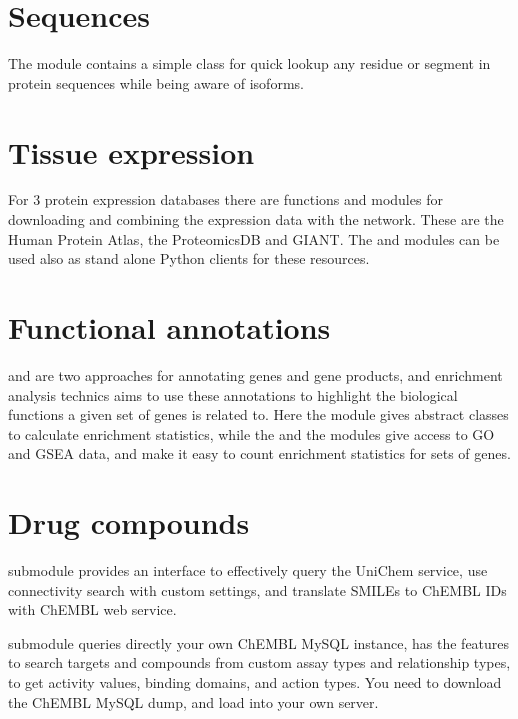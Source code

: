 \documentclass[letterpaper,10pt,english]{sphinxmanual}
\begin{document}
\section{Sequences}
\label{\detokenize{index:sequences}}
The module  contains a simple class for quick lookup any residue or
segment in  protein sequences while being aware of isoforms.


\section{Tissue expression}
\label{\detokenize{index:tissue-expression}}
For 3 protein expression databases there are functions and modules for
downloading and combining the expression data with the network. These are the
Human Protein Atlas, the ProteomicsDB and GIANT. The  and
 modules can be used also as stand alone Python clients for
these resources.


\section{Functional annotations}
\label{\detokenize{index:functional-annotations}}
 and  are two approaches for annotating genes and
gene products, and enrichment analysis technics aims to use these annotations
to highlight the biological functions a given set of genes is related to. Here
the  module gives abstract classes to calculate enrichment
statistics, while the  and the  modules give access to GO and
GSEA data, and make it easy to count enrichment statistics for sets of genes.


\section{Drug compounds}
\label{\detokenize{index:drug-compounds}}
 submodule provides an interface to effectively query the UniChem
service, use connectivity search with custom settings, and translate SMILEs to
ChEMBL IDs with ChEMBL web service.

 submodule queries directly your own ChEMBL MySQL instance, has the
features to search targets and compounds from custom assay types and
relationship types, to get activity values, binding domains, and action types.
You need to download the ChEMBL MySQL dump, and load into your own server.
\end{document}
